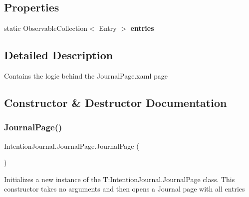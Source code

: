 \subsection*{Properties}
\begin{DoxyCompactItemize}
\item 
\mbox{\label{class_intention_journal_1_1_journal_page_a1b7f127189b6cd180011ffdef95210da}} 
static Observable\+Collection$<$ Entry $>$ {\bfseries entries}
\end{DoxyCompactItemize}


\subsection{Detailed Description}
Contains the logic behind the Journal\+Page.\+xaml page 



\subsection{Constructor \& Destructor Documentation}
\mbox{\label{class_intention_journal_1_1_journal_page_a7c92e3a38e307184a108336aff83771f}} 
\subsubsection{\texorpdfstring{Journal\+Page()}{JournalPage()}\hspace{0.1cm}{\footnotesize\ttfamily [1/2]}}
{\footnotesize\ttfamily Intention\+Journal.\+Journal\+Page.\+Journal\+Page (\begin{DoxyParamCaption}{ }\end{DoxyParamCaption})\hspace{0.3cm}{\ttfamily [inline]}}



Initializes a new instance of the T\+:\+Intention\+Journal.\+Journal\+Page class. This constructor takes no arguments and then opens a Journal page with all entries 

\mbox{\label{class_intention_journal_1_1_journal_page_a68635fe99822750ef9235610ce0a882e}} 
